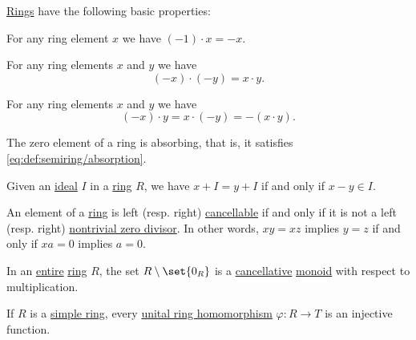 \begin{proposition}\label{thm:def:ring}
  \hyperref[def:ring]{Rings} have the following basic properties:
  \begin{thmenum}
     For any ring element \( x \) we have \( (-1) \cdot x = -x \).

     For any ring elements \( x \) and \( y \) we have
    \begin{equation}\label{eq:thm:def:ring/multiplication_even_sign}
      (-x) \cdot (-y) = x \cdot y.
    \end{equation}

     For any ring elements \( x \) and \( y \) we have
    \begin{equation}\label{eq:thm:def:ring/multiplication_odd_sign}
      (-x) \cdot y = x \cdot (-y) = -(x \cdot y).
    \end{equation}

     The zero element of a ring is absorbing, that is, it satisfies \eqref{eq:def:semiring/absorption}.

     Given an \hyperref[def:semiring_ideal]{ideal} \( I \) in a \hyperref[def:ring]{ring} \( R \), we have \( x + I = y + I \) if and only if \( x - y \in I \).

     An element of a \hyperref[def:ring]{ring} is left (resp. right) \hyperref[def:binary_operation/cancellative]{cancellable} if and only if it is not a left (resp. right) \hyperref[def:divisibility/zero]{nontrivial zero divisor}. In other words, \( xy = xz \) implies \( y = z \) if and only if \( xa = 0 \) implies \( a = 0 \).

     In an \hyperref[def:entire_semiring]{entire} \hyperref[def:ring]{ring} \( R \), the set \( R \setminus \set{ 0_R } \) is a \hyperref[def:binary_operation/cancellative]{cancellative} \hyperref[def:monoid]{monoid} with respect to multiplication.

     If \( R \) is a \hyperref[def:simple_object]{simple ring}, every \hyperref[def:ring/homomorphism]{unital ring homomorphism} \( \varphi: R \to T \) is an injective function.
  \end{thmenum}
\end{proposition}

